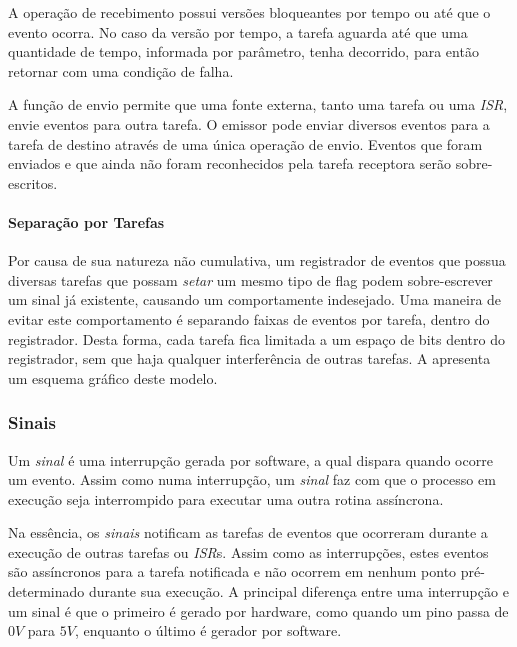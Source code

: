 A operação de recebimento possui versões bloqueantes por tempo ou até que o evento ocorra. No caso da versão por tempo, a tarefa aguarda até que uma quantidade de tempo, informada por parâmetro, tenha decorrido, para então retornar com uma condição de falha.

A função de envio permite que uma fonte externa, tanto uma tarefa ou uma \emph{ISR}, envie eventos para outra tarefa. O emissor pode enviar diversos eventos para a tarefa de destino através de uma única operação de envio. Eventos que foram enviados e que ainda não foram reconhecidos pela tarefa receptora serão sobre-escritos.

\paragraph{Separação por Tarefas}

Por causa de sua natureza não cumulativa, um registrador de eventos que possua diversas tarefas que possam \emph{setar} um mesmo tipo de flag podem sobre-escrever um sinal já existente, causando um comportamente indesejado. Uma maneira de evitar este comportamento é separando faixas de eventos por tarefa, dentro do registrador. Desta forma, cada tarefa fica limitada a um espaço de bits dentro do registrador, sem que haja qualquer interferência de outras tarefas. A  apresenta um esquema gráfico deste modelo.


\subsubsection{Sinais}

Um \emph{sinal} é uma interrupção gerada por software, a qual dispara quando ocorre um evento. Assim como numa interrupção, um \emph{sinal} faz com que o processo em execução seja interrompido para executar uma outra rotina assíncrona.

Na essência, os \emph{sinais} notificam as tarefas de eventos que ocorreram durante a execução de outras tarefas ou \emph{ISR}s. Assim como as interrupções, estes eventos são assíncronos para a tarefa notificada e não ocorrem em nenhum ponto pré-determinado durante sua execução. A principal diferença entre uma interrupção e um sinal é que o primeiro é gerado por hardware, como quando um pino passa de $0V$ para $5V$, enquanto o último é gerador por software.

